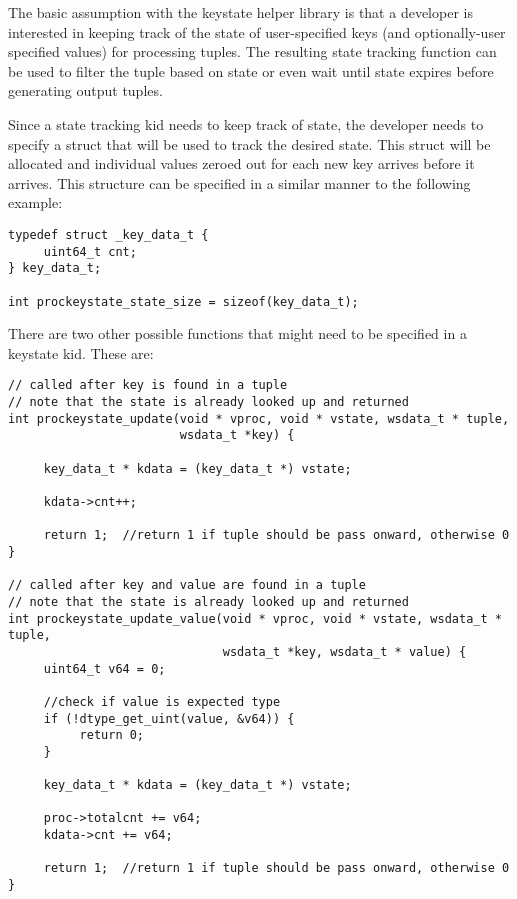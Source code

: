 \documentclass[11pt]{article}
\begin{document}
The basic assumption with the keystate helper library is that a developer is
interested in keeping track of the state of user-specified keys (and 
optionally-user specified values) for processing tuples. The resulting state 
tracking function can be used to filter the tuple based on state or even wait 
until state expires before generating output tuples.

Since a state tracking kid needs to keep track of state, the developer needs to
specify a struct that will be used to track the desired state.  This struct 
will be  allocated and individual values zeroed out for each new key arrives 
before it arrives.  This structure can be specified in a similar manner to the 
following example:

\begin{lstlisting}
typedef struct _key_data_t {
     uint64_t cnt;
} key_data_t;

int prockeystate_state_size = sizeof(key_data_t);
\end{lstlisting}

There are two other possible functions that might need to be specified in a 
keystate kid. These are:

\begin{lstlisting}
// called after key is found in a tuple
// note that the state is already looked up and returned
int prockeystate_update(void * vproc, void * vstate, wsdata_t * tuple,
                        wsdata_t *key) {

     key_data_t * kdata = (key_data_t *) vstate;

     kdata->cnt++;
     
     return 1;  //return 1 if tuple should be pass onward, otherwise 0
}

// called after key and value are found in a tuple
// note that the state is already looked up and returned
int prockeystate_update_value(void * vproc, void * vstate, wsdata_t * tuple,
                              wsdata_t *key, wsdata_t * value) {
     uint64_t v64 = 0;

     //check if value is expected type
     if (!dtype_get_uint(value, &v64)) {
          return 0;
     }

     key_data_t * kdata = (key_data_t *) vstate;

     proc->totalcnt += v64;
     kdata->cnt += v64;
     
     return 1;  //return 1 if tuple should be pass onward, otherwise 0
}
\end{lstlisting}
\end{document}
